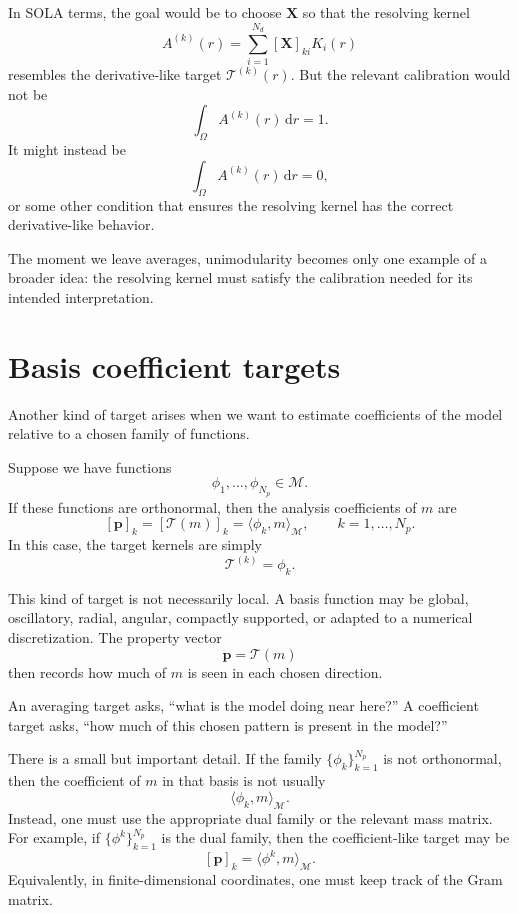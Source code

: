 \documentclass[11pt,openany]{book}
\theoremstyle{definition}
\theoremstyle{remark}
\newcommand{\M}{\mathcal M}
\newcommand{\Tau}{\mathcal{T}}
\newcommand{\dd}{\,\mathrm d}
\begin{document}
In SOLA terms, the goal would be to choose \(\mathbf X\) so that the resolving kernel
\[
  A^{(k)}(r)
  =
  \sum_{i=1}^{N_d}[\mathbf X]_{ki}K_i(r)
\]
resembles the derivative-like target \(\mathcal T^{(k)}(r)\). But the relevant calibration would
not be
\[
  \int_\Omega A^{(k)}(r)\dd r=1.
\]
It might instead be
\[
  \int_\Omega A^{(k)}(r)\dd r=0,
\]
or some other condition that ensures the resolving kernel has the correct derivative-like
behavior.

\begin{checkpointbox}
The moment we leave averages, unimodularity becomes only one example of a broader idea:
the resolving kernel must satisfy the calibration needed for its intended interpretation.
\end{checkpointbox}

\section{Basis coefficient targets}

Another kind of target arises when we want to estimate coefficients of the model relative to a
chosen family of functions.

Suppose we have functions
\[
  \phi_1,\dots,\phi_{N_p}\in\M.
\]
If these functions are orthonormal, then the analysis coefficients of \(m\) are
\[
  [\mathbf p]_k
  =
  [\Tau(m)]_k
  =
  \langle \phi_k,m\rangle_{\M},
  \qquad k=1,\dots,N_p.
\]
In this case, the target kernels are simply
\[
  \mathcal T^{(k)}=\phi_k.
\]

This kind of target is not necessarily local. A basis function may be global, oscillatory, radial,
angular, compactly supported, or adapted to a numerical discretization. The property vector
\[
  \mathbf p=\Tau(m)
\]
then records how much of \(m\) is seen in each chosen direction.

\begin{intuitionbox}
An averaging target asks, ``what is the model doing near here?'' A coefficient target asks,
``how much of this chosen pattern is present in the model?''
\end{intuitionbox}

There is a small but important detail. If the family \(\{\phi_k\}_{k=1}^{N_p}\) is not orthonormal,
then the coefficient of \(m\) in that basis is not usually
\[
  \langle \phi_k,m\rangle_{\M}.
\]
Instead, one must use the appropriate dual family or the relevant mass matrix. For example, if
\(\{\phi^k\}_{k=1}^{N_p}\) is the dual family, then the coefficient-like target may be
\[
  [\mathbf p]_k
  =
  \langle \phi^k,m\rangle_{\M}.
\]
Equivalently, in finite-dimensional coordinates, one must keep track of the Gram matrix.
\end{document}
